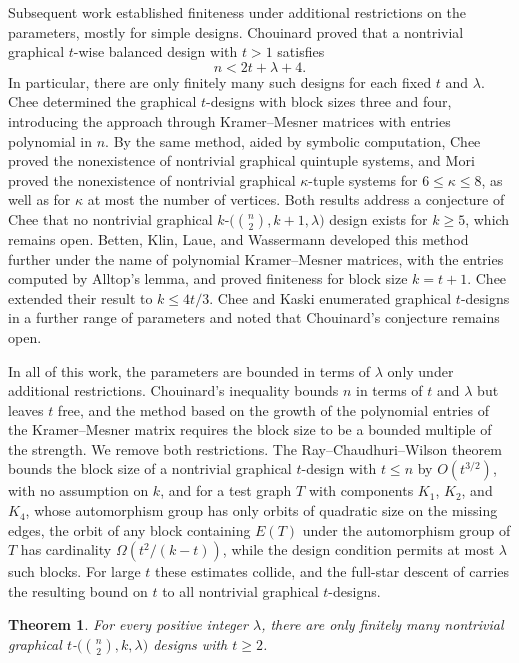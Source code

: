 \documentclass[12pt]{amsart}
\newtheorem{theorem}{Theorem}[section]
\theoremstyle{definition}
\begin{document}
Subsequent work established finiteness under additional restrictions on the
parameters, mostly for simple designs. Chouinard \cite{Chouinard1996} proved
that a nontrivial graphical $t$-wise balanced design with $t > 1$ satisfies
\[
n < 2t + \lambda + 4.
\]
In particular, there are only finitely many such designs for each fixed $t$
and $\lambda$. Chee \cite{Chee1991} determined the graphical $t$-designs
with block sizes three and four, introducing the approach through
Kramer--Mesner matrices with entries polynomial in $n$. By the same method,
aided by symbolic computation, Chee \cite{Chee1992} proved the nonexistence
of nontrivial graphical quintuple systems, and Mori \cite{Mori1994} proved
the nonexistence of nontrivial graphical $\kappa$-tuple systems for $6 \leq
\kappa \leq 8$, as well as for $\kappa$ at most the number of vertices. Both
results address a conjecture of Chee \cite{Chee1992} that no nontrivial
graphical $k$-$\bigl(\binom{n}{2}, k + 1, \lambda\bigr)$ design exists for
$k \geq 5$, which remains open. Betten, Klin, Laue, and Wassermann
\cite{BKLW1999} developed this method further under the name of polynomial
Kramer--Mesner matrices, with the entries computed by Alltop's lemma, and
proved finiteness for block size $k = t + 1$. Chee \cite{Chee2001} extended
their result to $k \leq 4t/3$. Chee and Kaski \cite{CheeKaski2008}
enumerated graphical $t$-designs in a further range of parameters and noted
that Chouinard's conjecture remains open.

In all of this work, the parameters are bounded in terms of $\lambda$ only
under additional restrictions. Chouinard's inequality bounds $n$ in terms of
$t$ and $\lambda$ but leaves $t$ free, and the method based on the growth of
the polynomial entries of the Kramer--Mesner matrix requires the block size
to be a bounded multiple of the strength. We remove both restrictions. The
Ray--Chaudhuri--Wilson theorem bounds the block size of a nontrivial
graphical $t$-design with $t \leq n$ by $O(t^{3/2})$, with no assumption on
$k$, and for a test graph $T$ with components $K_1$, $K_2$, and $K_4$, whose
automorphism group has only orbits of quadratic size on the missing edges,
the orbit of any block containing $E(T)$ under the automorphism group of $T$
has cardinality $\Omega(t^2/(k - t))$, while the design condition permits at
most $\lambda$ such blocks. For large $t$ these estimates collide, and the
full-star descent of \cite{CKK1983} carries the resulting bound on $t$ to
all nontrivial graphical $t$-designs.

\begin{theorem}
\label{thm:main}
For every positive integer $\lambda$, there are only finitely many
nontrivial graphical $t$-$\bigl(\binom{n}{2}, k, \lambda\bigr)$ designs with
$t \geq 2$.
\end{theorem}
\end{document}
